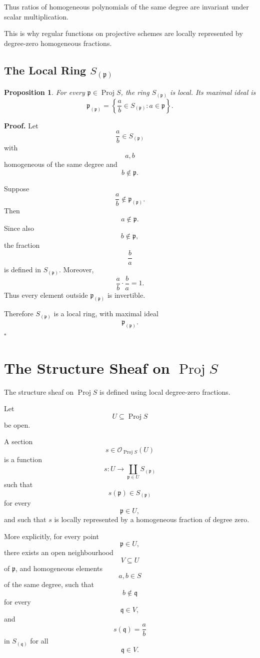 \documentclass[12pt,a4paper]{article}
\DeclareMathOperator{\Proj}{Proj}
\newtheorem{proposition}[theorem]{Proposition}
\theoremstyle{notespace}
\begin{document}
Thus ratios of homogeneous polynomials of the same degree are invariant under scalar
multiplication.

This is why regular functions on projective schemes are locally represented by
degree-zero homogeneous fractions.

\subsection{The Local Ring \texorpdfstring{$S_{(\mathfrak p)}$}{S(p)}}

\begin{proposition}
	For every \(\mathfrak p\in \Proj S\), the ring \(S_{(\mathfrak p)}\) is local.
	Its maximal ideal is
	\[
	\mathfrak p_{(\mathfrak p)}
	=
	\left\{
	\frac{a}{b}\in S_{(\mathfrak p)}:
	a\in\mathfrak p
	\right\}.
	\]
\end{proposition}

\textbf{Proof.}
Let
\[
\frac{a}{b}\in S_{(\mathfrak p)}
\]
with
\[
a,b
\]
homogeneous of the same degree and
\[
b\notin \mathfrak p.
\]

Suppose
\[
\frac{a}{b}\notin \mathfrak p_{(\mathfrak p)}.
\]
Then
\[
a\notin \mathfrak p.
\]
Since also
\[
b\notin \mathfrak p,
\]
the fraction
\[
\frac{b}{a}
\]
is defined in \(S_{(\mathfrak p)}\). Moreover,
\[
\frac{a}{b}\cdot\frac{b}{a}=1.
\]
Thus every element outside \(\mathfrak p_{(\mathfrak p)}\) is invertible.

Therefore \(S_{(\mathfrak p)}\) is a local ring, with maximal ideal
\[
\mathfrak p_{(\mathfrak p)}.
\]
\(\square\)

\section{The Structure Sheaf on \texorpdfstring{$\Proj S$}{Proj S}}

The structure sheaf on \(\Proj S\) is defined using local degree-zero fractions.

Let
\[
U\subseteq \Proj S
\]
be open.

A section
\[
s\in\mathcal O_{\Proj S}(U)
\]
is a function
\[
s:U\longrightarrow \coprod_{\mathfrak p\in U}S_{(\mathfrak p)}
\]
such that
\[
s(\mathfrak p)\in S_{(\mathfrak p)}
\]
for every
\[
\mathfrak p\in U,
\]
and such that \(s\) is locally represented by a homogeneous fraction of degree zero.

More explicitly, for every point
\[
\mathfrak p\in U,
\]
there exists an open neighbourhood
\[
V\subseteq U
\]
of \(\mathfrak p\), and homogeneous elements
\[
a,b\in S
\]
of the same degree, such that
\[
b\notin \mathfrak q
\]
for every
\[
\mathfrak q\in V,
\]
and
\[
s(\mathfrak q)=\frac{a}{b}
\]
in \(S_{(\mathfrak q)}\) for all
\[
\mathfrak q\in V.
\]
\end{document}
